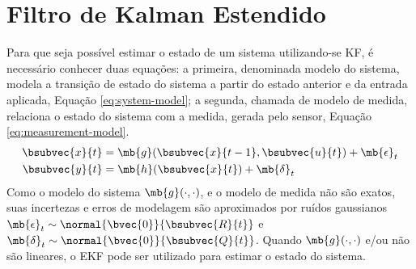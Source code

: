 \section{Filtro de Kalman Estendido}
\label{sec:ekf}
Para que seja possível estimar o estado de um sistema utilizando-se KF, é 
necessário conhecer duas equações: a primeira, denominada modelo do sistema, 
modela a transição de estado do sistema a partir do estado anterior e da entrada aplicada, Equação \ref{eq:system-model}; a segunda, chamada de modelo de medida, relaciona o estado do sistema com a medida, gerada pelo sensor, Equação \ref{eq:measurement-model}. 
\begin{align}
  \bsubvec{x}{t} &= \mb{g}(\bsubvec{x}{t-1}, \bsubvec{u}{t}) + \mb{\epsilon}_t
  \label{eq:system-model}\\
  \bsubvec{y}{t} &= \mb{h}(\bsubvec{x}{t}) + \mb{\delta}_t
  \label{eq:measurement-model}
\end{align}
\newcommand{\EKFSystemModel}{$\mb{g}(\cdot, \cdot)$}
Como o modelo do sistema \EKFSystemModel{}, e o modelo de medida \measurementModel{} não são exatos, suas incertezas e erros de modelagem são aproximados por ruídos gaussianos $\mb{\epsilon}_t \sim \normal{\bvec{0}}{\bsubvec{R}{t}}$ e $\mb{\delta}_t \sim \normal{\bvec{0}}{\bsubvec{Q}{t}}$. Quando \EKFSystemModel{} e/ou \measurementModel{} não são lineares, o EKF pode ser utilizado para estimar o estado 
do sistema. 

